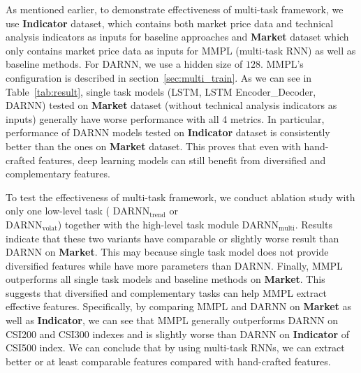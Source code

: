 As mentioned earlier, to demonstrate effectiveness of multi-task
framework, we use \textbf{Indicator} dataset, which contains both
market price data and technical analysis indicators as inputs for
baseline approaches and \textbf{Market} dataset which only
contains market price data as inputs for MMPL (multi-task RNN) as
well as baseline methods. For DARNN, we use a hidden size of
$128$. MMPL's configuration is described in
section~\ref{sec:multi_train}. As we can see in
Table~\ref{tab:result}, single task models (LSTM, LSTM
Encoder\_Decoder, DARNN) tested on \textbf{Market} dataset
(without technical analysis indicators as inputs) generally have
worse performance with all 4 metrics. In particular, performance of
DARNN models tested on \textbf{Indicator} dataset is consistently
better than the ones on \textbf{Market} dataset. This proves that
even with hand-crafted features, deep learning models can still
benefit from diversified and complementary features.

To test the effectiveness of multi-task framework, we conduct
ablation study with only one low-level task (\quad
$\text{DARNN}_\text{trend}$ \quad or \\
$\text{DARNN}_\text{volat}$) together with the high-level task
module $\text{DARNN}_\text{multi}$. Results indicate that these
two variants have comparable or slightly worse result than DARNN
on \textbf{Market}. This may because single task model does not
provide diversified features while have more parameters than
DARNN. Finally, MMPL outperforms all single task models and
baseline methods on \textbf{Market}. This suggests that
diversified and complementary tasks can help MMPL extract
effective features. Specifically, by comparing MMPL and DARNN on
\textbf{Market} as well as \textbf{Indicator}, we can see that
MMPL generally outperforms DARNN on CSI200 and CSI300 indexes and
is slightly worse than DARNN on \textbf{Indicator} of CSI500
index. We can conclude that by using multi-task RNNs, we can
extract better or at least comparable features compared with
hand-crafted features.

